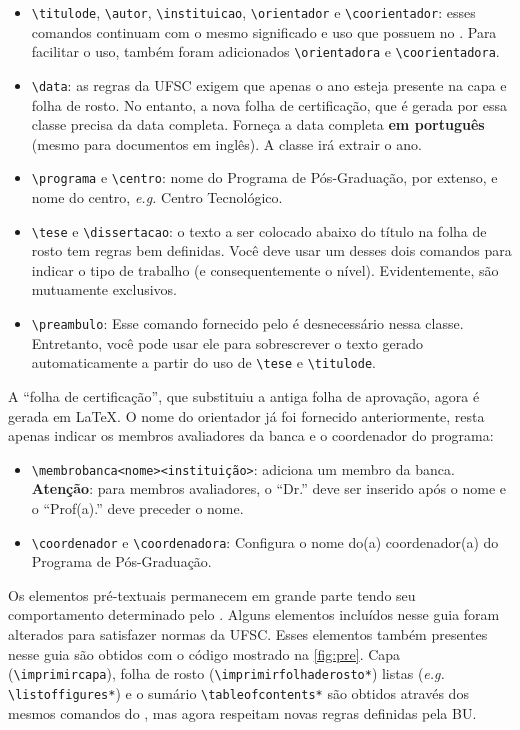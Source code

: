 \documentclass[embeddedlogo]{ufsc-thesis-rn46-2019}
\newcommand{\lacmd}[1]{\texttt{\textbackslash{}#1}}
\begin{document}
\begin{itemize}
  \item \lacmd{titulode}, \lacmd{autor}, \lacmd{instituicao}, \lacmd{orientador}
e \lacmd{coorientador}: esses comandos continuam com o mesmo significado e uso
que possuem no \abnTeX. Para facilitar o uso, também foram adicionados
\lacmd{orientadora} e \lacmd{coorientadora}.
  \item \lacmd{data}: as regras da UFSC exigem que apenas o ano esteja presente
na capa e folha de rosto. No entanto, a nova folha de certificação, que é gerada
por essa classe precisa da data completa. Forneça a data completa \textbf{em
português} (mesmo para documentos em inglês). A classe irá extrair o ano.
  \item \lacmd{programa} e \lacmd{centro}: nome do Programa de Pós-Graduação,
por extenso, e nome do centro, \emph{e.g.}  Centro Tecnológico.
  \item \lacmd{tese} e \lacmd{dissertacao}: o texto a ser colocado abaixo do
título na folha de rosto tem regras bem definidas. Você deve usar um desses dois
comandos para indicar o tipo de trabalho (e consequentemente o nível).
Evidentemente, são mutuamente exclusivos.
  \item \lacmd{preambulo}: Esse comando fornecido pelo \abnTeX{} é desnecessário
nessa classe. Entretanto, você pode usar ele para sobrescrever o texto gerado
automaticamente a partir do uso de \lacmd{tese} e \lacmd{titulode}.
\end{itemize}

A ``folha de certificação'', que substituiu a antiga folha de aprovação, agora
é gerada em \LaTeX. O nome do orientador já foi fornecido anteriormente, resta
apenas indicar os membros avaliadores da banca e o coordenador do programa:
\begin{itemize}
  \item \lacmd{membrobanca{<nome>}{<instituição>}}: adiciona um membro da banca.
\textbf{Atenção}: para membros avaliadores, o ``Dr.'' deve ser inserido após o
nome e o ``Prof(a).'' deve preceder o nome.
  \item \lacmd{coordenador} e \lacmd{coordenadora}: Configura o nome do(a)
coordenador(a) do Programa de Pós-Graduação.
\end{itemize}

Os elementos pré-textuais permanecem em grande parte tendo seu comportamento
determinado pelo \abnTeX. Alguns elementos incluídos nesse guia foram alterados
para satisfazer normas da UFSC. Esses elementos também presentes nesse guia são
obtidos com o código mostrado na \autoref{fig:pre}. Capa (\lacmd{imprimircapa}),
folha de rosto (\lacmd{imprimirfolhaderosto*}) listas (\emph{e.g.}
\lacmd{listoffigures*}) e o sumário \lacmd{tableofcontents*} são obtidos através
dos mesmos comandos do \abnTeX, mas agora respeitam novas regras definidas pela
BU.
\end{document}
